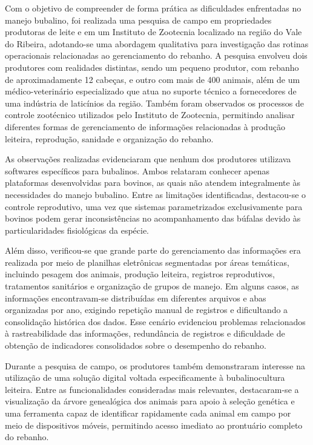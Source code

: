 \documentclass[11pt,a4paper]{article}
\begin{document}
Com o objetivo de compreender de forma prática as dificuldades enfrentadas no manejo bubalino, foi realizada uma pesquisa de campo em propriedades produtoras de leite e em um Instituto de Zootecnia localizado na região do Vale do Ribeira, adotando-se uma abordagem qualitativa para investigação das rotinas operacionais relacionadas ao gerenciamento do rebanho. A pesquisa envolveu dois produtores com realidades distintas, sendo um pequeno produtor, com rebanho de aproximadamente 12 cabeças, e outro com mais de 400 animais, além de um médico-veterinário especializado que atua no suporte técnico a fornecedores de uma indústria de laticínios da região. Também foram observados os processos de controle zootécnico utilizados pelo Instituto de Zootecnia, permitindo analisar diferentes formas de gerenciamento de informações relacionadas à produção leiteira, reprodução, sanidade e organização do rebanho.

As observações realizadas evidenciaram que nenhum dos produtores utilizava softwares específicos para bubalinos. Ambos relataram conhecer apenas plataformas desenvolvidas para bovinos, as quais não atendem integralmente às necessidades do manejo bubalino. Entre as limitações identificadas, destacou-se o controle reprodutivo, uma vez que sistemas parametrizados exclusivamente para bovinos podem gerar inconsistências no acompanhamento das búfalas devido às particularidades fisiológicas da espécie.

Além disso, verificou-se que grande parte do gerenciamento das informações era realizada por meio de planilhas eletrônicas segmentadas por áreas temáticas, incluindo pesagem dos animais, produção leiteira, registros reprodutivos, tratamentos sanitários e organização de grupos de manejo. Em alguns casos, as informações encontravam-se distribuídas em diferentes arquivos e abas organizadas por ano, exigindo repetição manual de registros e dificultando a consolidação histórica dos dados. Esse cenário evidenciou problemas relacionados à rastreabilidade das informações, redundância de registros e dificuldade de obtenção de indicadores consolidados sobre o desempenho do rebanho.

Durante a pesquisa de campo, os produtores também demonstraram interesse na utilização de uma solução digital voltada especificamente à bubalinocultura leiteira. Entre as funcionalidades consideradas mais relevantes, destacaram-se a visualização da árvore genealógica dos animais para apoio à seleção genética e uma ferramenta capaz de identificar rapidamente cada animal em campo por meio de dispositivos móveis, permitindo acesso imediato ao prontuário completo do rebanho.
\end{document}
